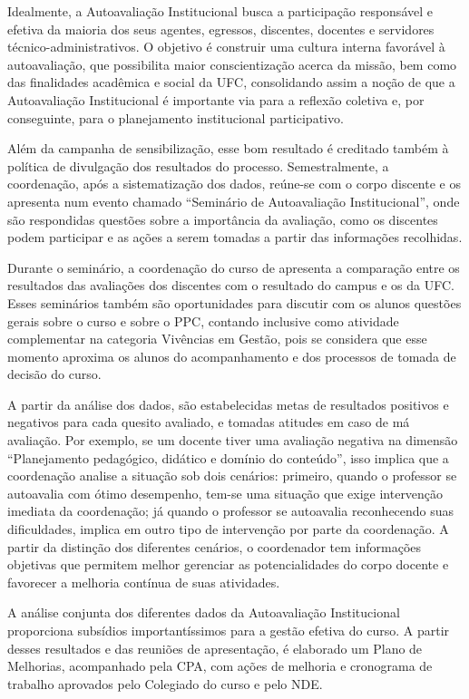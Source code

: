 Idealmente, a Autoavaliação Institucional busca a participação responsável e efetiva da maioria dos seus agentes, egressos, discentes, docentes e servidores técnico-administrativos. O objetivo é construir uma cultura interna favorável à autoavaliação, que possibilita maior conscientização acerca da missão, bem como das finalidades acadêmica e social da UFC, consolidando assim a noção de que a Autoavaliação Institucional é importante via para a reflexão coletiva e, por conseguinte, para o planejamento institucional participativo.

Além da campanha de sensibilização, esse bom resultado é creditado também à política de divulgação dos resultados do processo. Semestralmente, a coordenação, após a sistematização dos dados, reúne-se com o corpo discente e os apresenta num evento chamado “Seminário de Autoavaliação Institucional”, onde são respondidas questões sobre a importância da avaliação, como os discentes podem participar e as ações a serem tomadas a partir das informações recolhidas.

Durante o seminário, a coordenação do curso de \nomedocurso apresenta a comparação entre os resultados das avaliações dos discentes com o resultado do campus e os da UFC. Esses seminários também são oportunidades para discutir com os alunos questões gerais sobre o curso e sobre o PPC, contando inclusive como atividade complementar na categoria Vivências em Gestão, pois se considera que esse momento aproxima os alunos do acompanhamento e dos processos de tomada de decisão do curso.

A partir da análise dos dados, são estabelecidas metas de resultados positivos e negativos para cada quesito avaliado, e tomadas atitudes em caso de má avaliação. Por exemplo, se um docente tiver uma avaliação negativa na dimensão ``Planejamento pedagógico, didático e domínio do conteúdo'', isso implica que a coordenação analise a situação sob dois cenários: primeiro, quando o professor se autoavalia com ótimo desempenho, tem-se uma situação que exige intervenção imediata da coordenação; já quando o professor se autoavalia reconhecendo suas dificuldades, implica em outro tipo de intervenção por parte da coordenação. A partir da distinção dos diferentes cenários, o coordenador tem informações objetivas que permitem melhor gerenciar as potencialidades do corpo docente e favorecer a melhoria contínua de suas atividades.

A análise conjunta dos diferentes dados da Autoavaliação Institucional proporciona subsídios importantíssimos para a gestão efetiva do curso. A partir desses resultados e das reuniões de apresentação, é elaborado um Plano de Melhorias, acompanhado pela CPA, com ações de melhoria e cronograma de trabalho aprovados pelo Colegiado do curso e pelo NDE.


